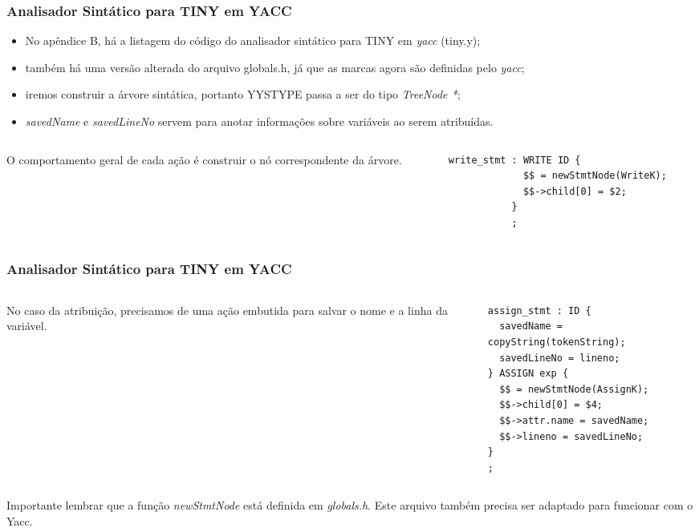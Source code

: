 \documentclass[table]{beamer}
\begin{document}
\begin{frame}[fragile]
   \frametitle{Analisador Sintático para TINY em YACC}
   \begin{itemize}
      \item No apêndice B, há a listagem do código do analisador sintático para TINY em \textit{yacc} (tiny.y);
      \item também há uma versão alterada do arquivo globals.h, já que as marcas agora são definidas pelo \textit{yacc};
      \item iremos construir a árvore sintática, portanto YYSTYPE passa a ser do tipo \textit{TreeNode *};
      \item \textit{savedName} e \textit{savedLineNo} servem para anotar informações sobre variáveis ao serem atribuídas.    
   \end{itemize}
   \begin{columns}
      \begin{column}{0.4\textwidth}
      O comportamento geral de cada ação é construir o nó correspondente da árvore.
      \end{column}
      \begin{column}{0.6\textwidth}
         \small
         \begin{verbatim}
write_stmt : WRITE ID {
             $$ = newStmtNode(WriteK);
             $$->child[0] = $2;
           }
           ;
         \end{verbatim}
      \end{column}
   \end{columns}
\end{frame}

\begin{frame}[fragile]
   \frametitle{Analisador Sintático para TINY em YACC}
   \begin{columns}
      \begin{column}{0.4\textwidth}
      No caso da atribuição, precisamos de uma ação embutida para salvar o nome e a linha da variável.
      \end{column}
      \begin{column}{0.6\textwidth}
         \small
         \begin{verbatim}
assign_stmt : ID {
  savedName = copyString(tokenString);
  savedLineNo = lineno;
} ASSIGN exp {
  $$ = newStmtNode(AssignK);
  $$->child[0] = $4;
  $$->attr.name = savedName;
  $$->lineno = savedLineNo;
}
;
         \end{verbatim}
      \end{column}
   \end{columns}
   Importante lembrar que a função \textit{newStmtNode} está definida em \textit{globals.h}. Este arquivo também precisa ser adaptado para funcionar com o Yacc.
\end{frame}
\end{document}
